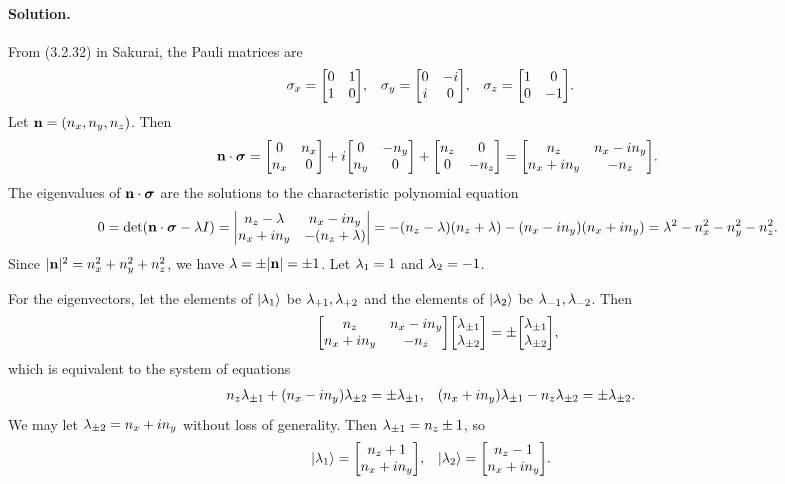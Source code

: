 \documentclass[11pt]{article}
\newcommand{\beq}{\begin{equation*}}
\newcommand{\eeq}{\end{equation*}}
\newenvironment{solution}
{
    \paragraph{Solution.}
    \ignorespaces
}
{
}
\begin{document}
\begin{solution}
	From (3.2.32) in Sakurai, the Pauli matrices are
	\begin{align*}
		\sigx &= \mqty[ 0 & 1 \\ 1 & 0 ], &
		\sigy &= \mqty[ 0 & -i \\ i & 0 ], &
		\sigz &= \mqty[ 1 & 0 \\ 0 & -1 ].
	\end{align*}
	Let $\mathbf{n} = (n_x, n_y, n_z)$.  Then
	\beq
		\nds = \mqty[ 0 & \nx \\ \nx & 0 ] + i \mqty[ 0 & -\ny \\ \ny & 0 ] + \mqty[ \nz & 0 \\ 0 & -\nz ]
		= \mqty[ \nz & \nx - i \ny \\ \nx + i \ny & -\nz ].
	\eeq
	The eigenvalues of $\mathbf{n} \cdot \boldsymbol{\sigma}$ are the solutions to the characteristic polynomial equation
	\beq
		0 = \det(\nds - \lam I) = \mdet{\nz - \lam & \nx - i \ny \\ \nx + i \ny & -(\nz + \lam)} = -(\nz - \lam) (\nz + \lam) - (\nx - i \ny) (\nx + i \ny) = \lam^2 - \nx^2 - \ny^2 - \nz^2.
	\eeq
	Since $|\mathbf{n}|^2 = n_x^2 + n_y^2 + n_z^2$, we have $\lambda = \pm |\mathbf{n}| = \pm 1$.  Let $\lambda_1 = 1$ and $\lambda_2 = -1$.
	
	For the eigenvectors, let the elements of $\ket{\lambda_1}$ be $\lambda_{+1}, \lambda_{+2}$ and the elements of $\ket{\lambda_2}$ be $\lambda_{-1}, \lambda_{-2}$.  Then
	\beq
		\mqty[ \nz & \nx - i \ny \\ \nx + i \ny & -\nz ] \mqty[ \lampmq \\ \lampmw ] = \pm \mqty[ \lampmq \\ \lampmw ],
	\eeq
	which is equivalent to the system of equations
	\begin{align*}
		n_z \lambda_{\pm1} + (n_x - i n_y) \lambda_{\pm2} &= \pm\lambda_{\pm1}, &
		(n_x + i n_y) \lambda_{\pm1} - n_z \lambda_{\pm2} &= \pm\lambda_{\pm2}.
	\end{align*}
	We may let $\lambda_{\pm2} = n_x + i n_y$ without loss of generality.  Then $\lambda_{\pm1} = n_z \pm 1$, so
	\begin{align*}
		\klamq &= \mqty[ \nz + 1 \\ \nx + i \ny ], &
		\klamw &= \mqty[ \nz - 1 \\ \nx + i \ny ].
	\end{align*}
\end{solution}
\end{document}
